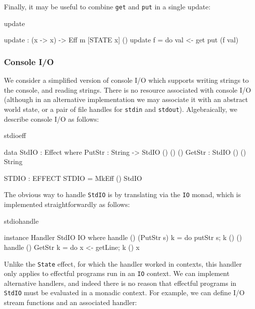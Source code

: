 \noindent
Finally, it may be useful to combine \texttt{get} and \texttt{put} in a single
update:

\begin{SaveVerbatim}{update}

update : (x -> x) -> Eff m [STATE x] ()
update f = do val <- get
              put (f val) 

\end{SaveVerbatim}

\subsubsection{Console I/O}

We consider a simplified version of console I/O which supports writing strings
to the console, and reading strings. There is no resource associated with
console I/O (although in an alternative implementation we may associate it
with an abstract world state, or a pair of file handles for \texttt{stdin}
and \texttt{stdout}). Algebraically, we describe console I/O as follows:

\begin{SaveVerbatim}{stdioeff}

data StdIO : Effect where
     PutStr : String -> StdIO () () ()
     GetStr : StdIO () () String

STDIO : EFFECT
STDIO = MkEff () StdIO

\end{SaveVerbatim}

\noindent
The obvious way to handle \texttt{StdIO} is by translating via the \texttt{IO}
monad, which is implemented straightforwardly as follows:

\begin{SaveVerbatim}{stdiohandle}

instance Handler StdIO IO where
    handle () (PutStr s) k = do putStr s; k () ()
    handle () GetStr     k = do x <- getLine; k () x 

\end{SaveVerbatim}

\noindent
Unlike the \texttt{State} effect, for which the handler worked in 
contexts, this handler only applies to effectful programs run in an \texttt{IO}
context. We can implement alternative handlers, and indeed there is no
reason that effectful programs in \texttt{StdIO} must be evaluated in a monadic
context. For example, we can define I/O stream functions and an associated
handler:

